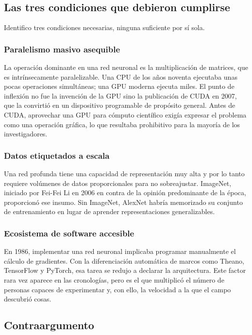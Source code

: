 \documentclass[12pt,letterpaper,oneside]{article}
\begin{document}
\subsection{Las tres condiciones que debieron cumplirse}

Identifico tres condiciones necesarias, ninguna suficiente por sí sola.

\subsubsection{Paralelismo masivo asequible}

La operación dominante en una red neuronal es la multiplicación de matrices, que es intrínsecamente paralelizable. Una CPU de los años noventa ejecutaba unas pocas operaciones simultáneas; una GPU moderna ejecuta miles. El punto de inflexión no fue la invención de la GPU sino la publicación de CUDA en 2007, que la convirtió en un dispositivo programable de propósito general. Antes de CUDA, aprovechar una GPU para cómputo científico exigía expresar el problema como una operación gráfica, lo que resultaba prohibitivo para la mayoría de los investigadores.

\subsubsection{Datos etiquetados a escala}

Una red profunda tiene una capacidad de representación muy alta y por lo tanto requiere volúmenes de datos proporcionales para no sobreajustar. ImageNet, iniciado por Fei-Fei Li en 2006 en contra de la opinión predominante de la época, proporcionó ese insumo. Sin ImageNet, AlexNet habría memorizado su conjunto de entrenamiento en lugar de aprender representaciones generalizables.

\subsubsection{Ecosistema de software accesible}

En 1986, implementar una red neuronal implicaba programar manualmente el cálculo de gradientes. Con la diferenciación automática de marcos como Theano, TensorFlow y PyTorch, esa tarea se redujo a declarar la arquitectura. Este factor rara vez aparece en las cronologías, pero es el que multiplicó el número de personas capaces de experimentar y, con ello, la velocidad a la que el campo descubrió cosas.

\subsection{Contraargumento}
\end{document}

